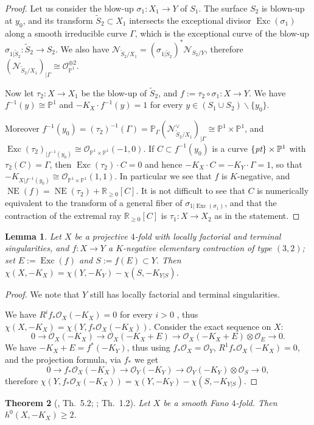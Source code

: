 \documentclass[a4paper,12pt]{amsart}
\newtheorem{thm}{Theorem}[section]
\newtheorem{lemma}[thm]{Lemma}
\theoremstyle{definition}
\numberwithin{figure}{section}
\numberwithin{table}{section}
\newcommand{\w}{\widetilde}
\newcommand{\ma}{\mathcal}
\newcommand{\la}{\longrightarrow}
\newcommand{\ol}{\mathcal{O}}
\newcommand{\pr}{\mathbb{P}}
\newcommand{\R}{\mathbb{R}}
\newcommand{\NE}{\operatorname{NE}}
\newcommand{\Exc}{\operatorname{Exc}}
\newcommand{\pt}{\text{\it pt}}
\begin{document}
\begin{proof}
  Let us consider the blow-up $\sigma_1\colon X_1\to Y$ of $S_1$. The surface $S_2$ is blown-up at $y_0$, and its transform $\w{S}_2\subset X_1$ intersects the exceptional divisor $\Exc(\sigma_1)$ along a smooth irreducible curve $\Gamma$, which is the exceptional curve of the blow-up $\sigma_{1|\w{S}_2}\colon \w{S}_2\to S_2$.
  We also have $\ma{N}_{\w{S}_2/X_1}=(\sigma_{1|\w{S}_2})^*\ma{N}_{S_2/Y}$, therefore
  $(\ma{N}_{\w{S}_2/X_1})_{|\Gamma}\cong\ol_{\pr^1}^{\oplus 2}$.

  Now let $\tau_2\colon X\to X_1$ be the blow-up of $\w{S}_2$, and $f:=\tau_2\circ\sigma_1\colon X\to Y$. We have  $f^{-1}(y)\cong\pr^1$ and $-K_X\cdot f^{-1}(y)=1$ for every $y\in (S_1\cup S_2)\smallsetminus\{y_0\}$.

  Moreover $f^{-1}(y_0)=(\tau_2)^{-1}(\Gamma)=\pr_{\Gamma}(\ma{N}_{\w{S}_2/X_1}^{\vee})_{|\Gamma}\cong\pr^1\times\pr^1$, and $\Exc(\tau_2)_{|f^{-1}(y_0)}\cong\ol_{\pr^1\times\pr^1}(-1,0)$. If $C\subset f^{-1}(y_0)$ is a curve $\{\pt\}\times\pr^1$ with $\tau_2(C)=\Gamma$, then $\Exc(\tau_2)\cdot C=0$ and hence $-K_X\cdot C=-K_Y\cdot \Gamma=1$, so that $-K_{X|f^{-1}(y_0)}\cong\ol_{\pr^1\times\pr^1}(1,1)$. In particular we see that $f$ is $K$-negative, and $\NE(f)=\NE(\tau_2)+\R_{\geq 0}[C]$. It is not difficult to see that $C$ is numerically equivalent to the transform of a general fiber of $\sigma_{1|\Exc(\sigma_1)}$, and that the contraction of the extremal ray $\R_{\geq 0}[C]$ is  $\tau_1\colon X\to X_2$ as in the statement.
\end{proof}
 \begin{lemma}\label{blowupformula}
    Let $X$ be a projective $4$-fold with locally factorial and terminal singularities, and $f\colon X\to Y$ a $K$-negative elementary contraction of type $(3,2)$; set $E:=\Exc(f)$ and $S:=f(E)\subset Y$. Then
     $\chi(X,-K_X)=\chi(Y,-K_Y)-\chi(S,-K_{Y|S})$.
   \end{lemma}
   \begin{proof}
     We note that $Y$ still has locally factorial and terminal singularities.
     
     We have $R^if_*\ol_X(-K_X)=0$ for every $i>0$ \cite[Cor.~2.68]{KollarMori}, thus $\chi(X,-K_X)=\chi(Y,f_*\ol_X(-K_X))$.
     Consider the exact sequence on $X$:
 $$0\la \ol_X(-K_X)\la\ol_X(-K_X+E)\la\ol_X(-K_X+E)\otimes\ol_E \la 0.$$
 We have $-K_X+E=f^*(-K_Y)$, thus using  $f_*\ol_X=\ol_Y$, $R^1f_*\ol_X(-K_X)=0$, and the projection formula, via $f_*$ we get
 $$ 0\la f_*\ol_X(-K_X)\la \ol_Y(-K_Y)\la \ol_Y(-K_Y)\otimes\ol_S\la 0,$$ therefore $\chi(Y,f_*\ol_X(-K_X))=\chi(Y,-K_Y)-\chi(S,-K_{Y|S})$.
\end{proof}
\begin{thm}[\cite{kawasian}, Th.~5.2; \cite{floris}; Th.~1.2]\label{h0}
    Let $X$ be a smooth Fano $4$-fold. Then 
    $h^0(X,-K_X)\geq 2$.
    \end{thm}
\end{document}
